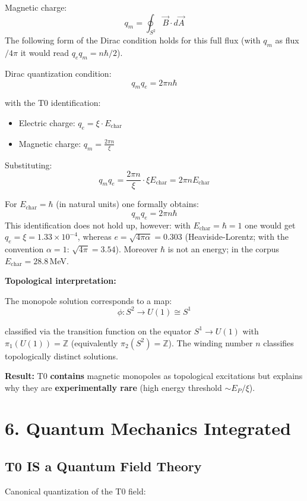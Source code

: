 	Magnetic charge:
	\[
	q_m = \oint_{S^2} \vec{B} \cdot d\vec{A}
	\]
	The following form of the Dirac condition holds for this full flux (with $q_m$ as flux$/4\pi$ it would read $q_e q_m = n\hbar/2$).
	
	Dirac quantization condition:
	\[
	q_m q_e = 2\pi n \hbar
	\]
	
	with the T0 identification:
	\begin{itemize}
		\item Electric charge: $q_e = \xi \cdot E_{\text{char}}$
		\item Magnetic charge: $q_m = \frac{2\pi n}{\xi}$
	\end{itemize}
	
	Substituting:
	\[
	q_m q_e = \frac{2\pi n}{\xi} \cdot \xi E_{\text{char}} = 2\pi n E_{\text{char}}
	\]
	
	For $E_{\text{char}} = \hbar$ (in natural units) one formally obtains:
	\[
	q_m q_e = 2\pi n \hbar
	\]
	This identification does not hold up, however: with $E_{\text{char}} = \hbar = 1$ one would get $q_e = \xi = 1.33\times10^{-4}$, whereas $e = \sqrt{4\pi\alpha} = 0.303$ (Heaviside-Lorentz; with the convention $\alpha = 1$: $\sqrt{4\pi} = 3.54$). Moreover $\hbar$ is not an energy; in the corpus $E_{\text{char}} = 28.8$\,MeV.
	
	\textbf{Topological interpretation:}
	
	The monopole solution corresponds to a map:
	\[
	\phi: S^2 \to U(1) \cong S^1
	\]
	
	classified via the transition function on the equator $S^1 \to U(1)$ with $\pi_1(U(1)) = \mathbb{Z}$ (equivalently $\pi_2(S^2) = \mathbb{Z}$). The winding number $n$ classifies topologically distinct solutions.
	
	\textbf{Result:} T0 \textbf{contains} magnetic monopoles as topological excitations but explains why they are \textbf{experimentally rare} (high energy threshold $\sim E_P/\xi$).
	
	\section*{6. Quantum Mechanics Integrated}
	
	\subsection*{\textbf{T0 IS a Quantum Field Theory}}
	
	Canonical quantization of the T0 field:
	
